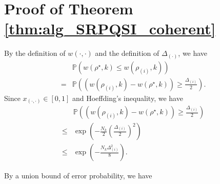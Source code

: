 \section{Proof of Theorem \ref{thm:alg_SRPQSI_coherent}}
\label{sec:proof_alg_SRPQSI_coherent}

    By the definition of $w(\cdot,\cdot)$ and the definition of $\Delta_{(\cdot)}$, we have
    \begin{equation*}
        \begin{aligned}
            & \mathbb{P}(w({\rho^\star,k}) \leq w({\rho_{(i)},k})) \\
            = & \mathbb{P}\left( (w(\rho_{(i)},k) -  w(\rho^\star,k))  \geq \frac{\Delta_{(i)}}{2}\right).
        \end{aligned}
    \end{equation*}
    Since $x_{(\cdot,\cdot)} \in [0,1]$ and Hoeffding's inequality, we have
    \begin{equation}
        \begin{aligned}
            & \mathbb{P}\left( (w(\rho_{(i)},k) -  w(\rho^\star,k))  \geq \frac{\Delta_{(i)}}{2}\right) \\
            \leq & \exp\left(- \frac{N_k}{2} \left(\frac{\Delta_{(i)}}{2}\right)^2 \right) \\
            \leq & \exp\left( - \frac{N_k \Delta^2_{(i)}}{8}\right).
        \end{aligned}
    \end{equation}

    By a union bound of error probability, we have 

